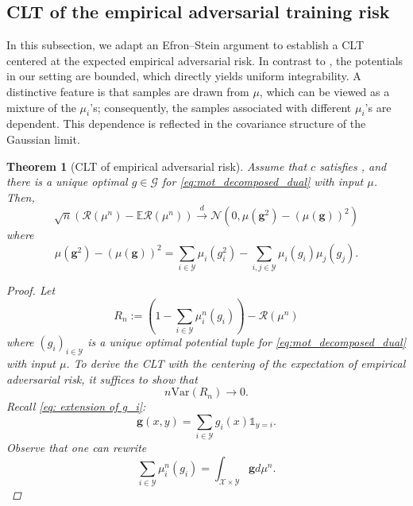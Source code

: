 \documentclass{amsart}
\theoremstyle{plain}
\numberwithin{equation}{section}\newtheorem{theorem}{Theorem}[section]
\theoremstyle{remark}
\begin{document}
\subsection{CLT of the empirical adversarial training risk}
In this subsection, we adapt an Efron–Stein argument to establish a CLT centered at the expected empirical adversarial risk. In contrast to \cite{CLT_general_transport2024}, the potentials in our setting are bounded, which directly yields uniform integrability. A distinctive feature is that samples are drawn from $\mu$, which can be viewed as a mixture of the $\mu_i$’s; consequently, the samples associated with different $\mu_i$’s are dependent. This dependence is reflected in the covariance structure of the Gaussian limit.


\begin{theorem}[CLT of empirical adversarial risk]\label{thm: CLT empirical}
Assume that $c$ satisfies , and there is a unique optimal $g \in \mathcal{G}$ for \eqref{eq:mot_decomposed_dual} with input $\mu$. Then,
\[
    \sqrt{n}(\mathscr{R}(\mu^n)- \mathbb{E}\mathscr{R}(\mu^n) ) \overset{d}{\longrightarrow} \mathcal{N} \left( 0, \mu(\bm{g}^2) - (\mu(\bm{g}) )^2 \right)
\]
where
\[
    \mu(\bm{g}^2) - (\mu(\bm{g}) )^2 = \sum_{i \in \mathcal{Y}} \mu_i \left( g_i^2 \right) - \sum_{i, j \in \mathcal{Y}} \mu_i \left( g_i \right) \mu_j \left( g_j \right).
\]

\begin{proof}
Let
\[
    R_n:= \left(1-\sum_{i \in \mathcal{Y}}  \mu_i^n (g_i) \right) - \mathscr{R}(\mu^n)
\]
where $(g_i)_{i \in \mathcal{Y}}$ is a unique optimal potential tuple for \eqref{eq:mot_decomposed_dual} with input $\mu$. To derive the CLT with the centering of the expectation of empirical adversarial risk, it suffices to show that
\[
    n \text{Var} (R_n) \longrightarrow 0.
\]
Recall \eqref{eq: extension of g_i}:
\[
    \bm{g}(x,y) = \sum_{i \in \mathcal{Y}} g_i(x) \mathds{1}_{y=i}.
\]
Observe that one can rewrite 
\[
    \sum_{i \in \mathcal{Y}}  \mu_i^n(g_i) = \int_{\mathcal{X} \times \mathcal{Y}} \bm{g} d\mu^n.
\]





\end{proof}
\end{theorem}
\end{document}
